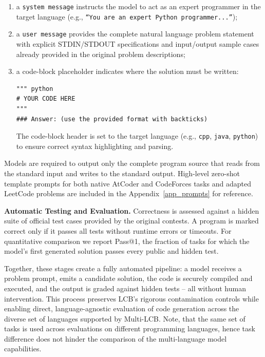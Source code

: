 \documentclass{article} %
\begin{document}
\begin{enumerate}
    \item  a \texttt{system message} instructs the model to act as an expert programmer in the target language  (e.g., \texttt{``You are an expert Python programmer...''});
    \item  a \texttt{user message} provides the complete natural language problem statement with explicit STDIN/STDOUT specifications and input/output sample cases already provided in the original problem descriptions; 
    \item a code-block placeholder indicates where the solution must be written:
\begin{verbatim}
""" python
# YOUR CODE HERE
"""
### Answer: (use the provided format with backticks)
\end{verbatim}
The code-block header is set to the target language (e.g., \texttt{cpp}, \texttt{java}, \texttt{python}) to ensure correct syntax highlighting and parsing.
\end{enumerate}


Models are required to output only the complete program source that reads from the standard input and writes to the standard output.
High-level zero-shot template prompts for both native AtCoder and CodeForces tasks and adapted LeetCode problems are included in the Appendix~\ref{app_prompts} for reference.


\textbf{Automatic Testing and Evaluation.} Correctness is assessed against a hidden suite of official test cases provided by the original contests. A program is marked correct only if it passes all tests without runtime errors or timeouts. For quantitative comparison we report Pass@1, the fraction of tasks for which the model’s first generated solution passes every public and hidden test.


Together, these stages create a fully automated pipeline: a model receives a problem prompt, emits a candidate solution, the code is securely compiled and executed, and the output is graded against hidden tests -- all without human intervention.
This process preserves LCB’s rigorous contamination controls while enabling direct, language-agnostic evaluation of code generation across the diverse set of languages supported by Multi-LCB. Note, that the same set of tasks is used across evaluations on different programming languages, hence task difference does not hinder the comparison of the multi-language model capabilities.
\end{document}
